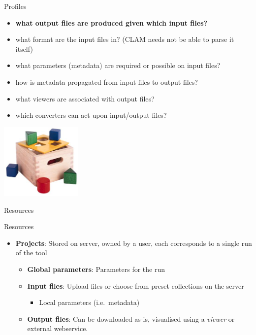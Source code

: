 \documentclass[xcolor=table,10pt,t]{beamer}
\begin{document}
\begin{frame}
    \begin{block}{Profiles}    
        \begin{itemize}
            \item \textbf{what output files are produced given which input files?}
            \item what format are the input files in? (CLAM needs not be able to parse it itself)
            \item what parameters (metadata) are required or possible on input files?
            \item how is metadata propagated from input files to output files?
            \item what viewers are associated with output files?
            \item which converters can act upon input/output files?
        \end{itemize}        
    \end{block}
    \includegraphics[width=40.0mm]{blokkendoos.jpg}
\end{frame}



\begin{frame}{Resources}
  \begin{block}{Resources}
      \begin{itemize}
          \item \textbf{Projects}: Stored on server, owned by a user, each corresponds to a single
              run of the tool
          \begin{itemize}
            \item \textbf{Global parameters}: Parameters for the run
            \item \textbf{Input files}: Upload files or choose from preset collections on the server
            \begin{itemize}
                \item Local parameters (i.e.\ metadata)
            \end{itemize}
            \item \textbf{Output files}: Can be downloaded as-is, visualised
                using a \emph{viewer} or external webservice. 
          \end{itemize}
      \end{itemize}
  \end{block}
\end{frame}
\end{document}
